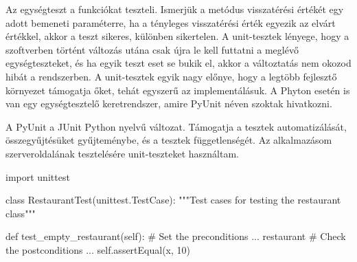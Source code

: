 Az egységteszt a funkciókat teszteli. Ismerjük a metódus visszatérési értékét egy adott bemeneti paraméterre, ha a tényleges visszatérési érték egyezik az elvárt értékkel, akkor a teszt sikeres, különben sikertelen. A unit-tesztek lényege, hogy a szoftverben történt változás utána csak újra le kell futtatni a meglévő egységteszteket, és ha egyik teszt eset se bukik el, akkor a változtatás nem okozod hibát a rendszerben.
A unit-tesztek egyik nagy előnye, hogy a legtöbb fejlesztő környezet támogatja őket, tehát egyszerű az implementálásuk. A Phyton esetén is van egy egységtesztelő keretrendszer, amire PyUnit néven szoktak hivatkozni.

A PyUnit a JUnit Python nyelvű változat. Támogatja a tesztek automatizálását, összegyűjtésüket gyűjteménybe, és a tesztek függetlenségét. Az alkalmazásom szerveroldalának tesztelésére unit-teszteket használtam.

\begin{python}
import unittest

class RestaurantTest(unittest.TestCase):
    """Test cases for testing the restaurant class"""
    
    def test_empty_restaurant(self):
        # Set the preconditions ...
        restaurant
        # Check the postconditions ...
        self.assertEqual(x, 10)
\end{python}

